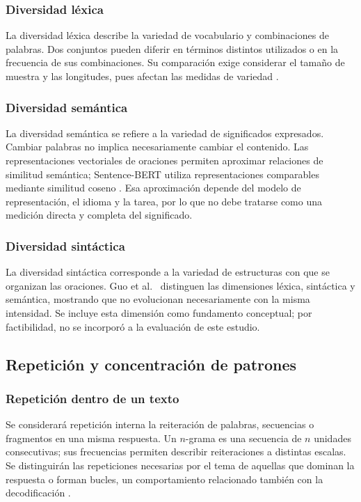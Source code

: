 \documentclass[12pt,letterpaper]{article}
\begin{document}
\subsubsection{Diversidad léxica}

La diversidad léxica describe la variedad de vocabulario y combinaciones
de palabras. Dos conjuntos pueden diferir en términos distintos utilizados
o en la frecuencia de sus combinaciones. Su comparación exige considerar
el tamaño de muestra y las longitudes, pues afectan las medidas de variedad
\cite{guo2024}.

\subsubsection{Diversidad semántica}

La diversidad semántica se refiere a la variedad de significados expresados.
Cambiar palabras no implica necesariamente cambiar el contenido. Las
representaciones vectoriales de oraciones permiten aproximar relaciones
de similitud semántica; Sentence-BERT utiliza representaciones comparables
mediante similitud coseno \cite{reimers2019}. Esa aproximación depende del
modelo de representación, el idioma y la tarea, por lo que no debe tratarse
como una medición directa y completa del significado.

\subsubsection{Diversidad sintáctica}

La diversidad sintáctica corresponde a la variedad de estructuras con que
se organizan las oraciones. Guo et al.\ \cite{guo2024} distinguen las
dimensiones léxica, sintáctica y semántica, mostrando que no evolucionan
necesariamente con la misma intensidad. Se incluye esta dimensión como
fundamento conceptual; por factibilidad, no se incorporó a la evaluación
de este estudio.

\subsection{Repetición y concentración de patrones}

\subsubsection{Repetición dentro de un texto}

Se considerará repetición interna la reiteración de palabras, secuencias
o fragmentos en una misma respuesta. Un \(n\)-grama es una secuencia de
\(n\) unidades consecutivas; sus frecuencias permiten describir
reiteraciones a distintas escalas. Se distinguirán las repeticiones
necesarias por el tema de aquellas que dominan la respuesta o forman
bucles, un comportamiento relacionado también con la decodificación
\cite{holtzman2020}.
\end{document}
